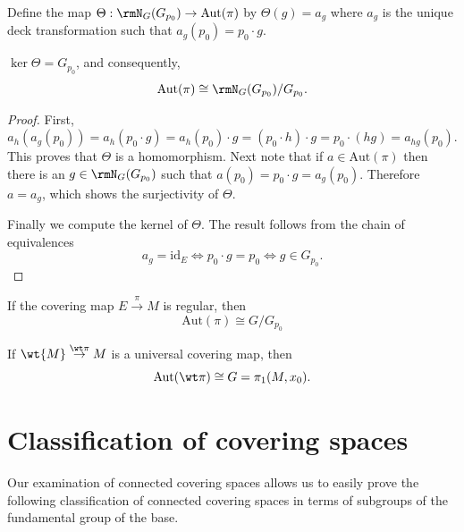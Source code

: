 \begin{defn}
    Define the map $\Theta:\rmN_G(G_{p_0})\to \mathrm{Aut}(\pi)$ by $\Theta(g)=a_g$ where $a_g$ is the unique deck transformation such that $a_g(p_0)=p_0\cdot g$.
\end{defn}
\begin{thm}\label{thm 6.8 Bredon}
    $\ker \Theta=G_{p_0}$, and consequently,
    \[\mathrm{Aut}(\pi)\cong \rmN_G(G_{p_0})\slash G_{p_0}.\]
\end{thm}
\begin{proof}
    First, 
    \[a_h(a_g(p_0))=a_h(p_0\cdot g)=a_h(p_0)\cdot g=(p_0\cdot h)\cdot g=p_0\cdot (hg)=a_{hg}(p_0).\]
    This proves that $\Theta$ is a homomorphism. Next note that if $a\in \mathrm{Aut}(\pi)$ then there is an $g\in \rmN_G(G_{p_0})$ such that $a(p_0)=p_0\cdot g=a_g(p_0)$. Therefore $a=a_g$, which shows the surjectivity of $\Theta$.

    Finally we compute the kernel of $\Theta$. The result follows from the chain of equivalences
    \[a_g=\mathrm{id}_E \Leftrightarrow p_0\cdot g=p_0\Leftrightarrow g\in G_{p_0}.\]
\end{proof}
\begin{cor}
    If the covering map $E\overset{\pi}{\to} M$ is regular, then 
    \[\mathrm{Aut}(\pi)\cong G/G_{p_0}\]
\end{cor}
\begin{cor}
    If $\wt{M}\overset{\wt\pi}{\to} M$ is a universal covering map, then
    \[\mathrm{Aut}(\wt\pi)\cong G=\pi_1(M,x_0).\]
\end{cor}





\section{Classification of covering spaces}

Our examination of connected covering spaces allows us to easily prove the following classification of connected covering spaces in terms of subgroups of the fundamental group of the base.

